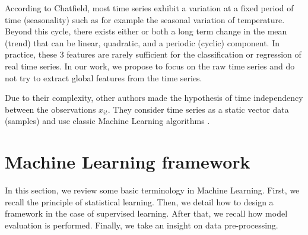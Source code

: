 \noindent According to Chatfield, most time series exhibit a variation at a fixed period of time (seasonality) such as for example the seasonal variation of temperature. Beyond this cycle, there exists either or both a long term change in the mean (trend) that can be linear, quadratic, and a periodic (cyclic) component. In practice, these 3 features are rarely sufficient for the classification or regression of real time series. In our work, we propose to focus on the raw time series and do not try to extract global features from the time series.

Due to their complexity, other authors made the hypothesis of time independency between the observations $x_{it}$. They consider time series as a static vector data (samples) and use classic Machine Learning algorithms \cite{Liang2012,Cao2001,Hu2013,Hwang2012}.




\section{Machine Learning framework}


In this section, we review some basic terminology in Machine Learning. First, we recall the principle of statistical learning. Then, we detail how to design a framework in the case of supervised learning. After that, we recall how model evaluation is performed. Finally, we take an insight on data pre-processing. 

